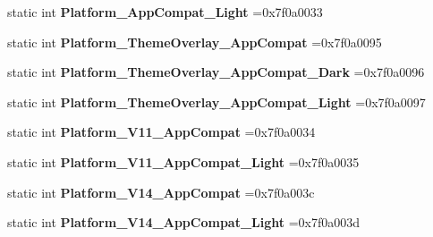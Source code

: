 \begin{DoxyCompactItemize}
\item 
\mbox{\label{classandroid_1_1support_1_1design_1_1R_1_1style_af04d76535b3e59272d3219708aa20db3}} 
static int {\bfseries Platform\+\_\+\+App\+Compat\+\_\+\+Light} =0x7f0a0033
\item 
\mbox{\label{classandroid_1_1support_1_1design_1_1R_1_1style_af343d1954d768d551fbc70ee14a869e6}} 
static int {\bfseries Platform\+\_\+\+Theme\+Overlay\+\_\+\+App\+Compat} =0x7f0a0095
\item 
\mbox{\label{classandroid_1_1support_1_1design_1_1R_1_1style_ae92b749ea35bc8dae40823799873275b}} 
static int {\bfseries Platform\+\_\+\+Theme\+Overlay\+\_\+\+App\+Compat\+\_\+\+Dark} =0x7f0a0096
\item 
\mbox{\label{classandroid_1_1support_1_1design_1_1R_1_1style_aa228abf880bf3e52d86cc7569347aef0}} 
static int {\bfseries Platform\+\_\+\+Theme\+Overlay\+\_\+\+App\+Compat\+\_\+\+Light} =0x7f0a0097
\item 
\mbox{\label{classandroid_1_1support_1_1design_1_1R_1_1style_a04f372b6f3d38875a15c3f2878f4dae6}} 
static int {\bfseries Platform\+\_\+\+V11\+\_\+\+App\+Compat} =0x7f0a0034
\item 
\mbox{\label{classandroid_1_1support_1_1design_1_1R_1_1style_ac16da0f4c23dd5edf4ef27101b962027}} 
static int {\bfseries Platform\+\_\+\+V11\+\_\+\+App\+Compat\+\_\+\+Light} =0x7f0a0035
\item 
\mbox{\label{classandroid_1_1support_1_1design_1_1R_1_1style_a4f1a53e2ea7f8c8445a883b6951867f2}} 
static int {\bfseries Platform\+\_\+\+V14\+\_\+\+App\+Compat} =0x7f0a003c
\item 
\mbox{\label{classandroid_1_1support_1_1design_1_1R_1_1style_a0f10615a909a7c346079f3395c84b7af}} 
static int {\bfseries Platform\+\_\+\+V14\+\_\+\+App\+Compat\+\_\+\+Light} =0x7f0a003d
\item 

\end{DoxyCompactItemize}
